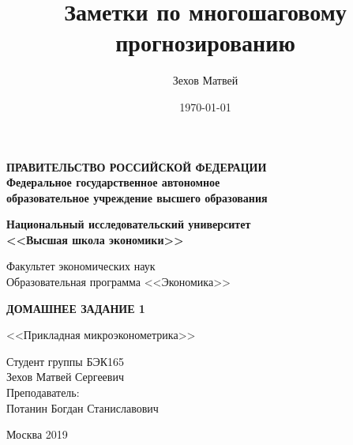 \documentclass[a4paper,12pt]{article}
\author{Зехов Матвей}
\title{Заметки по многошаговому прогнозированию}
\date{\today}
\begin{document}
	\newpage
\thispagestyle{empty}
\begin{center}
	\textbf{ПРАВИТЕЛЬСТВО РОССИЙСКОЙ ФЕДЕРАЦИИ}\\
	\vspace{2ex}
	\textbf{Федеральное государственное автономное\\ образовательное учреждение высшего образования}
	
	\vspace{2ex}
	
	\textbf{Национальный исследовательский университет \\ <<Высшая школа экономики>>}
	
	\vspace{8ex}
	\begin{flushright}
		Факультет экономических наук\\
		Образовательная программа <<Экономика>>
	\end{flushright}
\end{center}
\vspace{9ex}

\begin{center}
	{\textbf{ДОМАШНЕЕ ЗАДАНИЕ 1
	}}
	\vspace{1ex}
	
	<<Прикладная микроэконометрика>>
\end{center}
\vspace{1ex}
\begin{flushright}
	\noindent
	Студент группы БЭК165\\Зехов Матвей Сергеевич\\
	\vspace{13ex}
	Преподаватель:\\
	Потанин Богдан Станиславович
	
\end{flushright}	

\vfill

\begin{center}
	Москва 2019
	
\end{center}

\newpage
	\tableofcontents
	
\newpage
\end{document}
